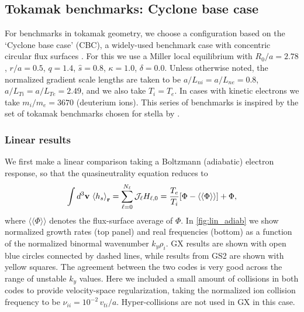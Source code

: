 \documentclass{jpp}
\newcommand{\GX}{{GX}\xspace}
\begin{document}
\subsection{Tokamak benchmarks: Cyclone base case %
}

For benchmarks in tokamak geometry, we choose a configuration based on the `Cyclone base case' (CBC), a widely-used benchmark case with concentric circular flux surfaces \citep{Dimits2000}. For this we use a Miller local equilibrium \citep{Miller1998} with $R_0/a=2.78$, $r/a=0.5$, $q=1.4$, $\hat{s}=0.8$, $\kappa=1.0$, $\delta=0.0$. Unless otherwise noted, the normalized gradient scale lengths are taken to be $a/L_{ni} = a/L_{ne} = 0.8$, $a/L_{Ti} = a/L_{Te}= 2.49$, and we also take $T_i = T_e$. {\color{black} In cases with kinetic electrons we take $m_i/m_e = 3670$ (deuterium ions).} This series of benchmarks is inspired by the set of tokamak benchmarks chosen for stella by \citet{Barnes2019}. 

\subsubsection{Linear results}


We first make a linear comparison taking a Boltzmann (adiabatic) electron response, so that the quasineutrality equation  reduces to
\begin{equation}
 \int d^3{\bf v}\ \langle{ h_s \rangle}_{\bf r} =  \sum_{\ell=0}^{\color{black} N_\ell}\mathcal{J}_\ell H_{\ell,0}  =\frac{T_e}{T_i}[\Phi - \langle\langle \Phi\rangle\rangle] + \Phi,
 \label{qneuta}
\end{equation}
where $\langle\langle\Phi\rangle\rangle$ denotes the flux-surface average of $\Phi$.
In \cref{fig:lin_adiab} we show normalized growth rates (top panel) and real frequencies (bottom) as a function of the normalized binormal wavenumber $k_y \rho_i$. \GX results are shown with open blue circles connected by dashed lines, while results from GS2 are shown with yellow squares. The agreement between the two codes is very good across the range of unstable $k_y$ values. Here we included a small amount of collisions in both codes to provide velocity-space regularization, taking the normalized ion collision frequency to be $\nu_{ii} = 10^{-2} \, v_{ti}/a$. Hyper-collisions are not used in \GX in this case.
\end{document}
